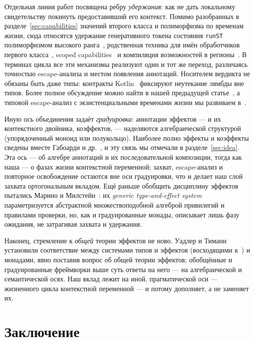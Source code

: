 \documentclass{ProcISPRAS}
\begin{document}
Отдельная линия работ посвящена ребру \emph{удержания}: как не дать локальному
свидетельству покинуть предоставивший его контекст. Помимо разобранных в
разделе~\ref{sec:capabilities} значений второго класса и полиморфизма по временам жизни,
сюда относятся удержание генеративного токена состояния \texttt{runST} полиморфизмом
высокого ранга~\cite{launchbury1995state}, родственная техника для имён обработчиков
первого класса~\cite{xie2022first}, scoped capabilities~\cite{odersky2022scoped} и
компиляция возможностей в регионы~\cite{mueller2023regions}. В
терминах цикла все эти механизмы реализуют один и тот же переход, различаясь точностью
escape-анализа и местом появления аннотаций. Носителем вердикта не обязаны быть даже
типы: контракты Kotlin~\cite{akhin2021kotlin} фиксируют неутекание лямбды вне типов.
Более полное обсуждение можно найти в нашей предыдущей
статье~\cite{stoyan2024modern}, а типовой escape-анализ с экзистенциальными временами
жизни мы развиваем в~\cite{stoyan2025existential}.

Иную ось объединения задаёт \emph{градуировка}: аннотации эффектов --- и их
контекстного двойника, коэффектов, --- наделяются алгебраической
структурой (упорядоченный моноид или полукольцо).
Наиболее полно эффекты и коэффекты сведены вместе Габоарди и др.~\cite{gaboardi2016combining},
и эту связь мы отмечали в разделе~\ref{sec:idea}. Эта ось --- об алгебре аннотаций и их
последовательной композиции, тогда как наша --- о фазах жизни контекстной переменной; захват,
escape-анализ и повторное освобождение остаются вне оси градуировки, что и делает наш слой захвата
ортогональным вкладом. Ещё раньше обобщить дисциплину эффектов пытались Марино и
Милстейн~\cite{marino2009generic}: их \emph{generic type-and-effect system} параметризуется
абстрактной множествоподобной алгеброй привилегий и правилами проверки, но, как и
градуированные монады, описывает лишь фазу ожидания, не затрагивая захвата и удержания.

Наконец, стремление к \emph{общей} теории эффектов не ново. Уадлер и
Тиманн~\cite{wadler2003marriage} установили соответствие между системами типов и эффектов
(восходящими к~\cite{lucassen1988polymorphic, talpin1994type}) и монадами, явно поставив
вопрос об общей теории эффектов; обобщённые и градуированные фреймворки выше суть ответы на
него --- на алгебраической и семантической осях. Наш вклад лежит на иной, прагматической
оси --- жизненного цикла контекстной переменной --- и потому дополняет, а не заменяет их.


\section{Заключение}
\label{sec:conclusion}
\end{document}

